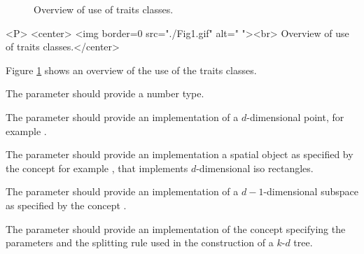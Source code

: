 \begin{figure}[t]
\begin{ccTexOnly}
\begin{center}
\leavevmode
\vspace*{6cm}
\hspace*{-2cm}
\end{center}
\vspace*{-8cm}
\end{ccTexOnly}
\caption{Overview of use of traits classes.
\label{ASPAS:Fig1}}
\end{figure}

\begin{ccHtmlOnly}

<P>
<center>
<img border=0 src="./Fig1.gif" alt=" "><br> 
Overview of use of traits classes.</center>
\end{ccHtmlOnly}

\begin{ccTexOnly}
Figure \ref{ASPAS:Fig1} shows an overview of the use of the traits classes.
\end{ccTexOnly}

The parameter  should provide a number type.

The parameter  should provide an implementation of a $d$-dimensional point, 
for example .

The parameter  should provide an implementation a spatial object
as specified by the concept 
for example , that implements $d$-dimensional iso rectangles.

The parameter  should provide an implementation of a $d-1$-dimensional
subspace as specified by the concept .

The parameter  should provide an implementation of the concept 
specifying the parameters and the splitting rule used in the construction of a $k$-$d$ tree.

